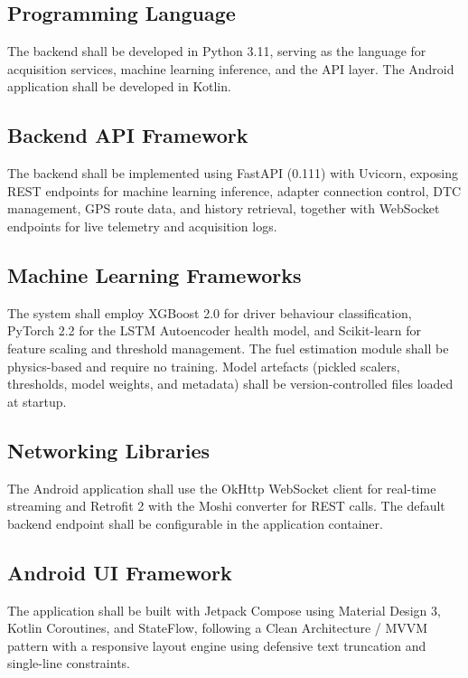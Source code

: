 \documentclass[10pt,a4paper]{report}
\begin{document}
\subsection{Programming Language}
The backend shall be developed in Python 3.11, serving as the language for acquisition services, machine learning inference, and the API layer. The Android application shall be developed in Kotlin. \par

\subsection{Backend API Framework}
The backend shall be implemented using FastAPI (0.111) with Uvicorn, exposing REST endpoints for machine learning inference, adapter connection control, DTC management, GPS route data, and history retrieval, together with WebSocket endpoints for live telemetry and acquisition logs. \par

\subsection{Machine Learning Frameworks}
The system shall employ XGBoost 2.0 for driver behaviour classification, PyTorch 2.2 for the LSTM Autoencoder health model, and Scikit-learn for feature scaling and threshold management. The fuel estimation module shall be physics-based and require no training. Model artefacts (pickled scalers, thresholds, model weights, and metadata) shall be version-controlled files loaded at startup. \par

\subsection{Networking Libraries}
The Android application shall use the OkHttp WebSocket client for real-time streaming and Retrofit 2 with the Moshi converter for REST calls. The default backend endpoint shall be configurable in the application container. \par

\subsection{Android UI Framework}
The application shall be built with Jetpack Compose using Material Design 3, Kotlin Coroutines, and StateFlow, following a Clean Architecture / MVVM pattern with a responsive layout engine using defensive text truncation and single-line constraints. \par
\end{document}
